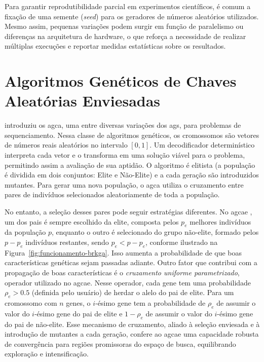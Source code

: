 Para garantir reprodutibilidade parcial em experimentos científicos, é comum a fixação de uma semente (\textit{seed}) para os geradores de números aleatórios utilizados. Mesmo assim, pequenas variações podem surgir em função de paralelismo ou diferenças na arquitetura de hardware, o que reforça a necessidade de realizar múltiplas execuções e reportar medidas estatísticas sobre os resultados.

\section{Algoritmos Genéticos de Chaves Aleatórias Enviesadas}

 introduziu os \gls{agca}, uma entre diversas variações dos \glspl{ag}, para problemas de sequenciamento. Nessa classe de algoritmos genéticos, os cromossomos são vetores de números reais aleatórios no intervalo $[0,1]$. Um decodificador determinístico interpreta cada vetor e o transforma em uma solução viável para o problema, permitindo assim a avaliação de sua aptidão. O algoritmo é elitista (a população é dividida em dois conjuntos: Elite e Não-Elite) e a cada geração são introduzidos mutantes. Para gerar uma nova população, o \gls{agca} utiliza o cruzamento entre pares de indivíduos selecionados aleatoriamente de toda a população. 

No entanto, a seleção desses pares pode seguir estratégias diferentes. No \gls{agcae} \cite{ericsson2002genetic, gonccalves2002hybrid, gonccalves2011biased, gonccalves2004evolutionary}, um dos pais é sempre escolhido da elite, composta pelos $p_e$ melhores indivíduos da população $p$, enquanto o outro é selecionado do grupo não-elite, formado pelos $p - p_e$ indivíduos restantes, sendo $p_e < p - p_e$, conforme ilustrado na Figura~\ref{fig:funcionamento-brkga}. Isso aumenta a probabilidade de que boas características genéticas sejam passadas adiante. Outro fator que contribui com a propagação de boas características é o \textit{cruzamento uniforme parametrizado}, operador utilizado no \gls{agcae}. Nesse operador, cada gene tem uma probabilidade $\rho_e > 0.5$ (definida pelo usuário) de herdar o alelo do pai de elite. Para um cromossomo com $n$ genes, o $i$-ésimo gene tem a probabilidade de $\rho_e$ de assumir o valor do $i$-ésimo gene do pai de elite e $1 - \rho_e$ de assumir o valor do $i$-ésimo gene do pai de não-elite. Esse mecanismo de cruzamento, aliado à seleção enviesada e à introdução de mutantes a cada geração, confere ao \gls{agcae} uma capacidade robusta de convergência para regiões promissoras do espaço de busca, equilibrando exploração e intensificação.

